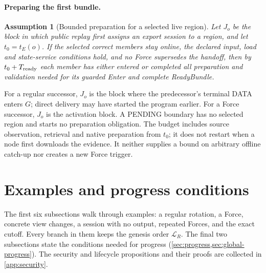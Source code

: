\documentclass[11pt,a4paper]{article}
\newtheorem{assumption}[assumption]{Assumption}
\begin{document}
\paragraph{Preparing the first bundle.}
\begin{assumption}[Bounded preparation for a selected live region]
\label{ass:ready-service}
Let $J_o$ be the block in which public replay first assigns an export
session to a region, and let $t_0=t_E(o)$. If the selected correct
members stay online, the declared input, load and state-service
conditions hold, and no Force supersedes the handoff, then by
$t_0+T_{\rm ready}$ each member has either entered or completed all
preparation and validation needed for its guarded Enter and complete
ReadyBundle.
\end{assumption}
For a regular successor, $J_o$ is the block where the predecessor's
terminal DATA enters $G$; direct delivery may have started the program
earlier. For a Force successor, $J_o$ is the activation block.
A PENDING boundary has no selected region and starts no preparation
obligation. The budget includes source observation, retrieval and native
preparation from $t_0$; it does not restart when a node first downloads
the evidence. It neither supplies a bound on arbitrary offline catch-up
nor creates a new Force trigger.

\section{Examples and progress conditions}
\label{sec:examples}
The first six subsections walk through examples: a regular rotation, a
Force, concrete view changes, a session with no output, repeated Forces,
and the exact cutoff. Every branch in them keeps the genesis order $\mathcal L_R$.
The final two subsections state the conditions
needed for progress (\cref{sec:progress,sec:global-progress}).
The security and lifecycle propositions and their proofs are collected
in \cref{app:security}.
\end{document}
